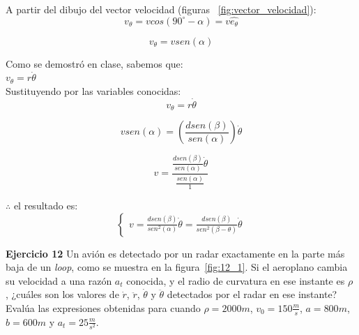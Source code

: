\documentclass[a4paper,11pt]{scrartcl}
\begin{document}
\begin{center}
A partir del dibujo del vector velocidad (figuras ~\ref{fig:vector_velocidad}):\\

\begin{equation}
v_{\theta} = v cos(90^{\circ} - \alpha) = v \hat{e_{\theta}}
\end{equation}

\begin{equation}
v_{\theta} = v sen(\alpha)
\end{equation}

Como se demostró en clase, sabemos que:\\
\hfill \break
$v_{\theta} = r \dot{\theta}$\\
\hfill \break
Sustituyendo por las variables conocidas:\\

\begin{equation}
v_{\theta} = r \dot{\theta}
\end{equation}

\begin{equation}
v sen(\alpha) = (\frac{d sen(\beta)}{sen(\alpha)}) \dot{\theta}
\end{equation}

\begin{equation}
v = \frac{\frac{d sen(\beta)}{sen(\alpha)} \dot{\theta}}{\frac{sen(\alpha)}{1}}
\end{equation}

$\therefore$ el resultado es:\\

\begin{equation}
  \left\lbrace
  \begin{array}{l}
v = \frac{d sen(\beta)}{sen^{2}(\alpha)} \dot{\theta} = \frac{d sen(\beta)}{sen^{2}(\beta - \theta)} \dot{\theta}
  \end{array}
  \right.
\end{equation}
\end{center}

\textbf{Ejercicio 12} Un avión es detectado por un radar exactamente en la parte más baja de un \textit{loop}, como se
muestra en la figura~\ref{fig:12_1}. Si el aeroplano cambia su velocidad a una razón $a_t$ conocida, y el radio de curvatura en ese instante es $\rho$ , ¿cuáles son los valores de $\dot{r}$, $\ddot{r}$, $\dot{\theta}$ y $\ddot{\theta}$ detectados por el radar en ese instante? Evalúa las expresiones obtenidas para cuando $\rho = 2000 m$, $v_0 = 150 \frac{m}{s}$, $a = 800 m$, $b = 600 m$ y $a_t = 25 \frac{m}{s^{2}}$.\\
\end{document}

